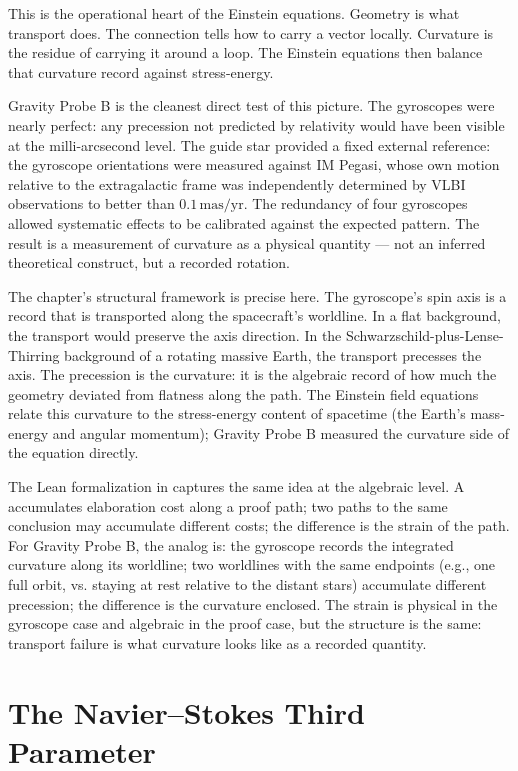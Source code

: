 This is the operational heart of the Einstein equations. Geometry is what
transport does. The connection tells how to carry a vector locally.
Curvature is the residue of carrying it around a loop. The Einstein
equations then balance that curvature record against stress-energy.

Gravity Probe B is the cleanest direct test of this picture. The
gyroscopes were nearly perfect: any precession not predicted by
relativity would have been visible at the milli-arcsecond level. The
guide star provided a fixed external reference: the gyroscope orientations
were measured against IM Pegasi, whose own motion relative to the
extragalactic frame was independently determined by VLBI observations
to better than $0{.}1\,\mathrm{mas/yr}$. The redundancy of four
gyroscopes allowed systematic effects to be calibrated against the
expected pattern. The result is a measurement of curvature as a
physical quantity --- not an inferred theoretical construct, but a
recorded rotation.

The chapter's structural framework is precise here. The gyroscope's
spin axis is a record that is transported along the spacecraft's
worldline. In a flat background, the transport would preserve the
axis direction. In the Schwarzschild-plus-Lense-Thirring background
of a rotating massive Earth, the transport precesses the axis. The
precession is the curvature: it is the algebraic record of how much
the geometry deviated from flatness along the path. The Einstein
field equations relate this curvature to the stress-energy content
of spacetime (the Earth's mass-energy and angular momentum); Gravity
Probe B measured the curvature side of the equation directly.

The Lean formalization in  captures the same
idea at the algebraic level. A  accumulates
elaboration cost along a proof path; two paths to the same
conclusion may accumulate different costs; the difference is the
strain of the path. For Gravity Probe B, the analog is: the gyroscope
records the integrated curvature along its worldline; two worldlines
with the same endpoints (e.g., one full orbit, vs. staying at rest
relative to the distant stars) accumulate different precession; the
difference is the curvature enclosed. The strain is physical in the
gyroscope case and algebraic in the proof case, but the structure
is the same: transport failure is what curvature looks like as a
recorded quantity.

\section{The Navier--Stokes Third Parameter}
\label{se:the-navier-stokes-third-parameter}

